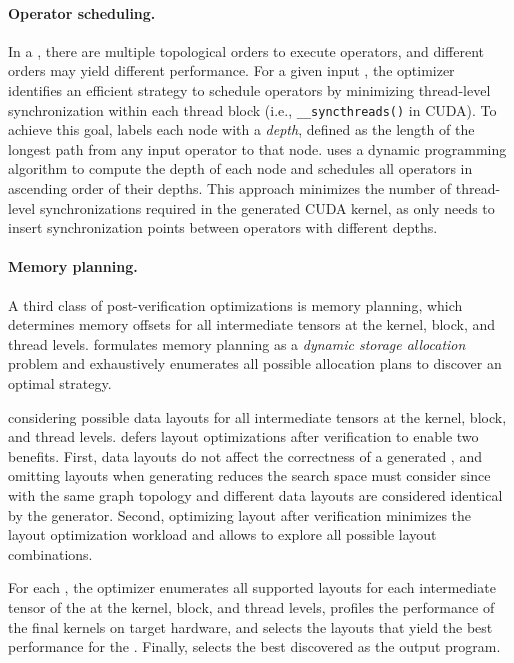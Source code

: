 \paragraph{Operator scheduling.} In a \graph, there are multiple topological orders to execute operators, and different orders may yield different performance. 
For a given input \graph, the \graph optimizer identifies an efficient strategy to schedule operators by minimizing thread-level synchronization within each thread block (i.e., {\tt \_\_syncthreads()} in CUDA). 
To achieve this goal, \sys labels each node with a {\em depth}, defined as the length of the longest path from any input operator to that node. \sys uses a dynamic programming algorithm to compute the depth of each node and schedules all operators in ascending order of their depths.
This approach minimizes the number of thread-level synchronizations required in the generated CUDA kernel, as \sys only needs to insert synchronization points between operators with different depths.

\paragraph{Memory planning.} A third class of post-verification optimizations is memory planning, which determines memory offsets for all intermediate tensors at the kernel, block, and thread levels. \sys formulates memory planning as a {\em dynamic storage allocation} problem and exhaustively enumerates all possible allocation plans to discover an optimal strategy.

considering possible data layouts for all intermediate tensors at the kernel, block, and thread levels.
%
\sys defers layout optimizations after verification to enable two benefits.
%
First, data layouts do not affect the correctness of a generated \graph, and omitting layouts when generating \graphs reduces the search space \sys must consider since \graphs with the same graph topology and different data layouts are considered identical by the \graph generator.
%
Second, optimizing layout after verification minimizes the layout optimization workload and allows \sys to explore all possible layout combinations.

For each \graph, the optimizer enumerates all supported layouts for each intermediate tensor of the \graph at the kernel, block, and thread levels, profiles the performance of the final kernels on target hardware, and selects the layouts that yield the best performance for the \graph.
%
Finally, \sys selects the best discovered \graph as the output program.
\fi 